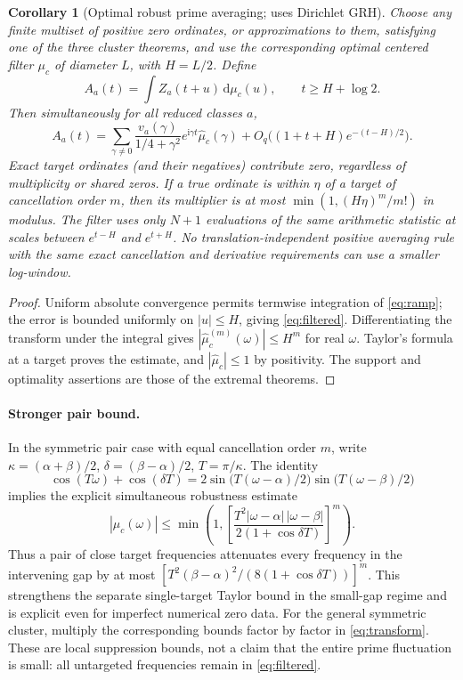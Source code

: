 \documentclass[11pt]{article}
\newtheorem{corollary}[theorem]{Corollary}
\theoremstyle{remark}\newtheorem{remark}[theorem]{Remark}
\newcommand{\dd}{\,\mathrm d}
\newcommand{\ii}{\mathrm i}
\begin{document}
\begin{corollary}[Optimal robust prime averaging; uses Dirichlet GRH]\label{cor:prime}
Choose any finite multiset of positive zero ordinates, or approximations to them, satisfying one of the three cluster theorems, and use the corresponding optimal centered filter $\mu_c$ of diameter $L$, with $H=L/2$. Define
\[
 A_a(t)=\int Z_a(t+u)\dd\mu_c(u),\qquad t\ge H+\log2.
\]
Then simultaneously for all reduced classes $a$,
\begin{equation}\label{eq:filtered}
 A_a(t)=\sum_{\gamma\ne0}\frac{v_a(\gamma)}{1/4+\gamma^2}e^{\ii\gamma t}\widehat\mu_c(\gamma)
 +O_q\bigl((1+t+H)e^{-(t-H)/2}\bigr).
\end{equation}
Exact target ordinates (and their negatives) contribute zero, regardless of multiplicity or shared zeros. If a true ordinate is within $\eta$ of a target of cancellation order $m$, then its multiplier is at most $\min(1,(H\eta)^m/m!)$ in modulus. The filter uses only $N+1$ evaluations of the same arithmetic statistic at scales between $e^{t-H}$ and $e^{t+H}$. No translation-independent positive averaging rule with the same exact cancellation and derivative requirements can use a smaller log-window.
\end{corollary}
\begin{proof}
Uniform absolute convergence permits termwise integration of \eqref{eq:ramp}; the error is bounded uniformly on $|u|\le H$, giving \eqref{eq:filtered}. Differentiating the transform under the integral gives $|\widehat\mu_c^{(m)}(\omega)|\le H^m$ for real $\omega$. Taylor's formula at a target proves the estimate, and $|\widehat\mu_c|\le1$ by positivity. The support and optimality assertions are those of the extremal theorems.\end{proof}

\paragraph{Stronger pair bound.} In the symmetric pair case with equal cancellation order $m$, write $\kappa=(\alpha+\beta)/2$, $\delta=(\beta-\alpha)/2$, $T=\pi/\kappa$. The identity
\[
 \cos(T\omega)+\cos(\delta T)=2\sin\bigl(T(\omega-\alpha)/2\bigr)\sin\bigl(T(\omega-\beta)/2\bigr)
\]
implies the explicit simultaneous robustness estimate
\begin{equation}\label{eq:pairbound}
 |\widehat\mu_c(\omega)|\le\min\left(1,\left[\frac{T^2|\omega-\alpha|\,|\omega-\beta|}{2(1+\cos\delta T)}\right]^m\right).
\end{equation}
Thus a pair of close target frequencies attenuates every frequency in the intervening gap by at most $[T^2(\beta-\alpha)^2/(8(1+\cos\delta T))]^m$. This strengthens the separate single-target Taylor bound in the small-gap regime and is explicit even for imperfect numerical zero data. For the general symmetric cluster, multiply the corresponding bounds factor by factor in \eqref{eq:transform}. These are local suppression bounds, not a claim that the entire prime fluctuation is small: all untargeted frequencies remain in \eqref{eq:filtered}.
\end{document}
